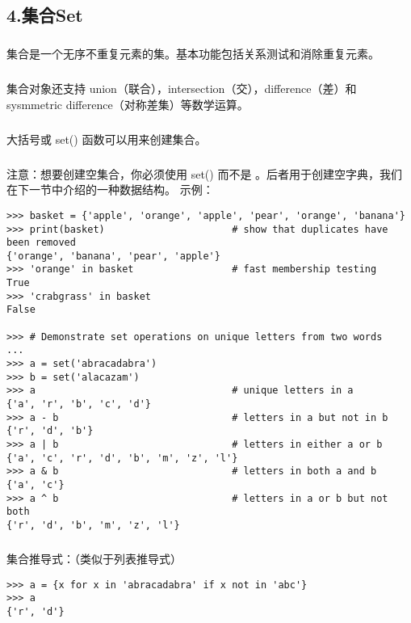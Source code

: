 \documentclass{article}
\begin{document}
\begin{CJK}{UTF8}{gbsn}
\section*{4.集合Set}
\subparagraph*{}
集合是一个无序不重复元素的集。基本功能包括关系测试和消除重复元素。
\subparagraph*{}
集合对象还支持 union（联合），intersection（交），difference（差）和 sysmmetric difference（对称差集）等数学运算。
\subparagraph*{}
大括号或 set() 函数可以用来创建集合。
\subparagraph*{}
注意：想要创建空集合，你必须使用 set() 而不是 {}。后者用于创建空字典，我们在下一节中介绍的一种数据结构。
示例：
\begin{verbatim}
>>> basket = {'apple', 'orange', 'apple', 'pear', 'orange', 'banana'}
>>> print(basket)                      # show that duplicates have been removed
{'orange', 'banana', 'pear', 'apple'}
>>> 'orange' in basket                 # fast membership testing
True
>>> 'crabgrass' in basket
False

>>> # Demonstrate set operations on unique letters from two words
...
>>> a = set('abracadabra')
>>> b = set('alacazam')
>>> a                                  # unique letters in a
{'a', 'r', 'b', 'c', 'd'}
>>> a - b                              # letters in a but not in b
{'r', 'd', 'b'}
>>> a | b                              # letters in either a or b
{'a', 'c', 'r', 'd', 'b', 'm', 'z', 'l'}
>>> a & b                              # letters in both a and b
{'a', 'c'}
>>> a ^ b                              # letters in a or b but not both
{'r', 'd', 'b', 'm', 'z', 'l'}
\end{verbatim}
\subparagraph*{}
集合推导式：（类似于列表推导式）
\begin{verbatim}
>>> a = {x for x in 'abracadabra' if x not in 'abc'}
>>> a
{'r', 'd'}
\end{verbatim}

\end{CJK}
\end{document}

